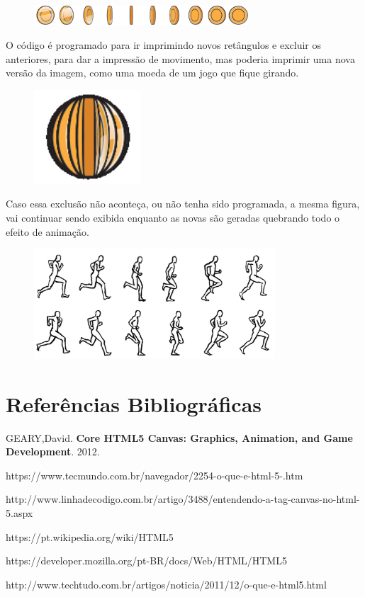 \documentclass[12pt,a4paper]{article}
\begin{document}
\begin{figure}[htb]		\label{figura:LogoIF}		\centering	\includegraphics[width=8cm]{recursos/imagens/moedas.png}  \end{figure}

O código é programado para ir imprimindo novos retângulos e excluir os anteriores, para dar a impressão de movimento, mas poderia imprimir uma nova versão da imagem, como uma moeda de um jogo que fique girando.



\begin{figure}[htb]		\label{figura:LogoIF}		\centering	\includegraphics[width=4cm]{recursos/imagens/moedas2.png}  \end{figure}

Caso essa exclusão não aconteça, ou não tenha sido programada, a mesma figura, vai continuar sendo exibida enquanto as novas são geradas quebrando todo o efeito de animação.

\begin{figure}[htb]		\label{figura:LogoIF}		\centering	\includegraphics[width=9cm]{recursos/imagens/running.jpg}  \end{figure}









\section{Referências Bibliográficas}

\noindent GEARY,David. \textbf{Core HTML5 Canvas: Graphics, Animation, and Game Development}. 2012.

\noindent https://www.tecmundo.com.br/navegador/2254-o-que-e-html-5-.htm

\noindent http://www.linhadecodigo.com.br/artigo/3488/entendendo-a-tag-canvas-no-html-5.aspx

\noindent https://pt.wikipedia.org/wiki/HTML5

\noindent https://developer.mozilla.org/pt-BR/docs/Web/HTML/HTML5

\noindent http://www.techtudo.com.br/artigos/noticia/2011/12/o-que-e-html5.html
\end{document}
